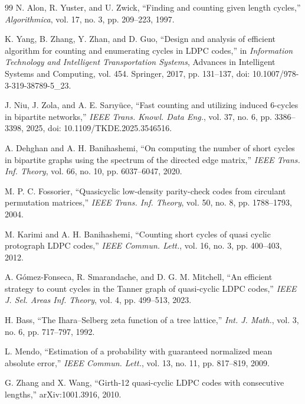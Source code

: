 \documentclass[conference]{IEEEtran}
\begin{document}
\begin{thebibliography}{99}
N. Alon, R. Yuster, and U. Zwick,
``Finding and counting given length cycles,''
\emph{Algorithmica}, vol. 17, no. 3,
pp. 209--223, 1997.

K. Yang, B. Zhang, Y. Zhan, and D. Guo,
``Design and analysis of efficient algorithm for counting
and enumerating cycles in LDPC codes,''
in \emph{Information Technology and Intelligent Transportation Systems},
Advances in Intelligent Systems and Computing, vol. 454.
Springer, 2017, pp. 131--137,
doi: 10.1007/978-3-319-38789-5\_23.

J. Niu, J. Zola, and A. E. Sar{\i}y\"uce,
``Fast counting and utilizing induced 6-cycles in bipartite networks,''
\emph{IEEE Trans. Knowl. Data Eng.}, vol. 37, no. 6,
pp. 3386--3398, 2025,
doi: 10.1109/TKDE.2025.3546516.

A. Dehghan and A. H. Banihashemi,
``On computing the number of short cycles in bipartite graphs
using the spectrum of the directed edge matrix,''
\emph{IEEE Trans. Inf. Theory}, vol. 66, no. 10,
pp. 6037--6047, 2020.

M. P. C. Fossorier,
``Quasicyclic low-density parity-check codes
from circulant permutation matrices,''
\emph{IEEE Trans. Inf. Theory}, vol. 50, no. 8,
pp. 1788--1793, 2004.

M. Karimi and A. H. Banihashemi,
``Counting short cycles of quasi cyclic protograph LDPC codes,''
\emph{IEEE Commun. Lett.}, vol. 16, no. 3,
pp. 400--403, 2012.

A. G\'omez-Fonseca, R. Smarandache, and D. G. M. Mitchell,
``An efficient strategy to count cycles in the Tanner graph
of quasi-cyclic LDPC codes,''
\emph{IEEE J. Sel. Areas Inf. Theory}, vol. 4,
pp. 499--513, 2023.

H. Bass,
``The Ihara--Selberg zeta function of a tree lattice,''
\emph{Int. J. Math.}, vol. 3, no. 6,
pp. 717--797, 1992.

L. Mendo,
``Estimation of a probability with guaranteed normalized
mean absolute error,''
\emph{IEEE Commun. Lett.}, vol. 13, no. 11,
pp. 817--819, 2009.

G. Zhang and X. Wang,
``Girth-12 quasi-cyclic LDPC codes with consecutive lengths,''
arXiv:1001.3916, 2010.

\end{thebibliography}
\end{document}
